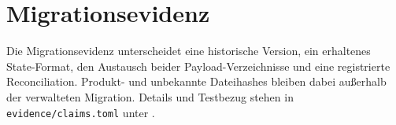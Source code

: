 \section{Migrationsevidenz}
\label{app:migration-evidence}

Die Migrationsevidenz unterscheidet eine historische Version, ein erhaltenes State-Format,
den Austausch beider Payload-Verzeichnisse und eine registrierte Reconciliation. Produkt-
und unbekannte Dateihashes bleiben dabei außerhalb der verwalteten Migration. Details und
Testbezug stehen in \texttt{evidence/claims.toml} unter .
